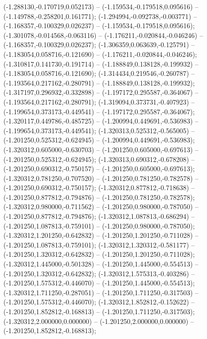  (-1.288130,-0.170719,0.052173) -- (-1.159534,-0.179518,0.095616) -- (-1.149788,-0.258201,0.161771);
 (-1.294994,-0.092738,-0.003771) -- (-1.168357,-0.100329,0.026237) -- (-1.159534,-0.179518,0.095616);
 (-1.301078,-0.014568,-0.063116) -- (-1.176211,-0.020844,-0.046246) -- (-1.168357,-0.100329,0.026237);
 (-1.306359,0.063639,-0.125791) -- (-1.183054,0.058716,-0.121690) -- (-1.176211,-0.020844,-0.046246);
 (-1.310817,0.141730,-0.191714) -- (-1.188849,0.138128,-0.199932) -- (-1.183054,0.058716,-0.121690);
 (-1.314434,0.219546,-0.260787) -- (-1.193564,0.217162,-0.280791) -- (-1.188849,0.138128,-0.199932);
 (-1.317197,0.296932,-0.332898) -- (-1.197172,0.295587,-0.364067) -- (-1.193564,0.217162,-0.280791);
 (-1.319094,0.373731,-0.407923) -- (-1.199654,0.373173,-0.449541) -- (-1.197172,0.295587,-0.364067);
 (-1.320117,0.449786,-0.485725) -- (-1.200994,0.449691,-0.536983) -- (-1.199654,0.373173,-0.449541);
 (-1.320313,0.525312,-0.565005) -- (-1.201250,0.525312,-0.624945) -- (-1.200994,0.449691,-0.536983);
 (-1.320312,0.605000,-0.630703) -- (-1.201250,0.605000,-0.697613) -- (-1.201250,0.525312,-0.624945);
 (-1.320313,0.690312,-0.678208) -- (-1.201250,0.690312,-0.750157) -- (-1.201250,0.605000,-0.697613);
 (-1.320312,0.781250,-0.707520) -- (-1.201250,0.781250,-0.782578) -- (-1.201250,0.690312,-0.750157);
 (-1.320312,0.877812,-0.718638) -- (-1.201250,0.877812,-0.794876) -- (-1.201250,0.781250,-0.782578);
 (-1.320312,0.980000,-0.711562) -- (-1.201250,0.980000,-0.787050) -- (-1.201250,0.877812,-0.794876);
 (-1.320312,1.087813,-0.686294) -- (-1.201250,1.087813,-0.759101) -- (-1.201250,0.980000,-0.787050);
 (-1.320312,1.201250,-0.642832) -- (-1.201250,1.201250,-0.711028) -- (-1.201250,1.087813,-0.759101);
 (-1.320312,1.320312,-0.581177) -- (-1.201250,1.320312,-0.642832) -- (-1.201250,1.201250,-0.711028);
 (-1.320312,1.445000,-0.501328) -- (-1.201250,1.445000,-0.554513) -- (-1.201250,1.320312,-0.642832);
 (-1.320312,1.575313,-0.403286) -- (-1.201250,1.575312,-0.446070) -- (-1.201250,1.445000,-0.554513);
 (-1.320312,1.711250,-0.287051) -- (-1.201250,1.711250,-0.317503) -- (-1.201250,1.575312,-0.446070);
 (-1.320312,1.852812,-0.152622) -- (-1.201250,1.852812,-0.168813) -- (-1.201250,1.711250,-0.317503);
 (-1.320312,2.000000,0.000000) -- (-1.201250,2.000000,0.000000) -- (-1.201250,1.852812,-0.168813);
